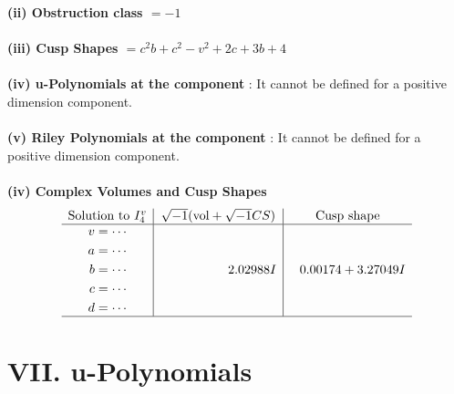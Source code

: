 \documentclass[1p]{elsarticle_modified}
\theoremstyle{definition}
\newcommand{\I}{\sqrt{-1}}
\begin{document}
\flushleft \textbf{(ii) Obstruction class $= -1$}\\~\\
\flushleft \textbf{(iii) Cusp Shapes $= c^2 b+c^2- v^2+2 c+3 b+4$}\\~\\
\flushleft \textbf{(iv) u-Polynomials at the component} : It cannot be defined for a positive dimension component.\\~\\
\flushleft \textbf{(v) Riley Polynomials at the component} : It cannot be defined for a positive dimension component.\\~\\
\newpage\flushleft \textbf{(iv) Complex Volumes and Cusp Shapes}
$$\begin{array}{c|c|c} 
\text{Solution to }I^v_{4}& \I (\text{vol} + \sqrt{-1}CS) & \text{Cusp shape}\\
 \hline 
\begin{aligned}
v &= \cdots \\
a &= \cdots \\
b &= \cdots \\
c &= \cdots \\
d &= \cdots\end{aligned}
 & \phantom{-0.000000 -}2.02988 I & \phantom{-}0.00174 + 3.27049 I\\
 \hline 
 \end{array}
$$
\newpage\renewcommand{\arraystretch}{1}
\centering \section*{ VII. u-Polynomials}
\end{document}
